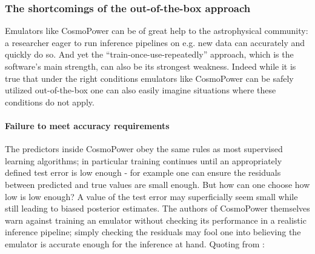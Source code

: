 \subsubsection{The shortcomings of the out-of-the-box approach}
Emulators like CosmoPower can be of great help to the astrophysical community: a researcher eager to run inference pipelines on e.g. new data can accurately and quickly do so. And yet the ``train-once-use-repeatedly'' approach, which is the software's main strength, can also be its strongest weakness. Indeed while it is true that under the right conditions emulators like CosmoPower can be safely utilized out-of-the-box one can also easily imagine situations where these conditions do not apply.

\paragraph{Failure to meet accuracy requirements}
The predictors inside CosmoPower obey the same rules as most supervised learning algorithms; in particular training continues until an appropriately defined test error is low enough - for example one can ensure the residuals between predicted and true values are small enough. But how can one choose how low is low enough? A value of the test error may superficially seem small while still leading to biased posterior estimates. The authors of CosmoPower themselves warn against training an emulator without checking its performance in a realistic inference pipeline; simply checking the residuals may fool one into believing the emulator is accurate enough for the inference at hand.
Quoting from \cite{cosmopower}:
